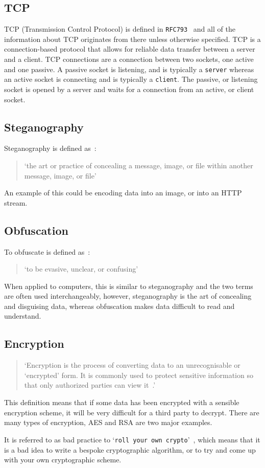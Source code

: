 \subsection{TCP}
TCP (Transmission Control Protocol) is defined in \texttt{RFC793}~\cite{rfc793} and all of the information about TCP originates from there unless otherwise specified.
TCP is a connection-based protocol that allows for reliable data transfer between a server and a client.
TCP connections are a connection between two sockets, one active and one passive.
A passive socket is listening, and is typically a \texttt{server} whereas an active socket is connecting and is typically a \texttt{client}.
The passive, or listening socket is opened by a server and waits for a connection from an active, or client socket.

\subsection{Steganography}
Steganography is defined as~\cite{dictsteno}:
\begin{quotation}
    `the art or practice of concealing a message, image, or file within
    another message, image, or file'
\end{quotation}
An example of this could be encoding data into an image, or into an HTTP stream.

\subsection{Obfuscation}
To obfuscate is defined as~\cite{dictobfs}:
\begin{quotation}
     `to be evasive, unclear, or confusing'
\end{quotation}
When applied to computers, this is similar to steganography and the two terms are often used interchangeably, however, steganography is the art of concealing and disguising data, whereas obfuscation makes data difficult to read and understand. 

\subsection{Encryption}
\begin{quotation}
    `Encryption is the process of converting data to an unrecognisable or
    `encrypted' form. It is commonly used to protect sensitive
    information so that only authorized parties can view it~\cite{dictenc}.'
\end{quotation}
This definition means that if some data has been encrypted with a sensible encryption scheme, it will be very difficult for a third party to decrypt.
There are many types of encryption, AES and RSA are two major examples.\par
It is referred to as bad practice to `\texttt{roll your own crypto}'~\cite{memtocrypto}, which means that it is a bad idea to write a bespoke cryptographic algorithm, or to try and come up with your own cryptographic scheme.

